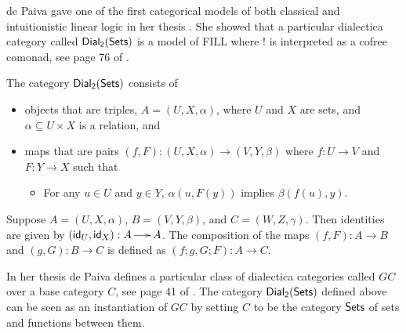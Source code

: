 de Paiva gave one of the first categorical models of both classical
and intuitionistic linear logic in her thesis \cite{dePaiva:1988}. She
showed that a particular dialectica category called $\mathsf{Dial_2}(\mathsf{Sets})$ is a model
of FILL where $!$ is interpreted as a cofree comonad, see page 76 of
\cite{dePaiva:1988}.
\begin{definition}
  \label{def:dial2sets}
  The category $\mathsf{Dial_2}(\mathsf{Sets})$ consists of 
  \begin{itemize}
  \item objects that are triples, $A = (U,X,\alpha)$, where $U$ and
    $X$ are sets, and $\alpha \subseteq U \times X$ is a relation, and
  \item maps that are pairs $(f,F) : (U,X,\alpha) \to (V,Y,\beta)$
    where $f : U \to V$ and $F : Y \to X$ such that
    \begin{itemize}
    \item For any $u \in U$ and $y \in Y$, $\alpha(u,F(y))$ implies $\beta(f(u),y)$.
    \end{itemize}
  \end{itemize}
  Suppose $A = (U,X,\alpha)$, $B = (V,Y,\beta)$, and
  $C = (W,Z,\gamma)$.  Then identities are given by
  $(\mathsf{id}_U,\mathsf{id}_X) : A \to A$.  The composition of the maps
  $(f,F) : A \to B$ and $(g, G) : B \to C$ is defined as
  $(f;g,G;F) : A \to C$.
\end{definition}
In her thesis de Paiva defines a particular class of dialectica
categories called $GC$ over a base category $C$, see page 41 of
\cite{dePaiva:1988}.  The category $\mathsf{Dial_2}(\mathsf{Sets})$
defined above can be seen as an instantiation of $GC$ by setting $C$
to be the category $\mathsf{Sets}$ of sets and functions between them.


